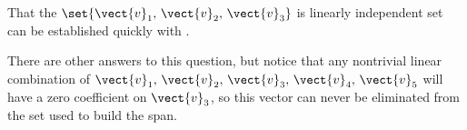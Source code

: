 %
That the $\set{\vect{v}_1,\,\vect{v}_2,\,\vect{v}_3}$ is linearly independent set can be established quickly with .\par
%
There are other answers to this question, but notice that any nontrivial linear combination of $\vect{v}_1,\,\vect{v}_2,\,\vect{v}_3,\,\vect{v}_4,\,\vect{v}_5$ will have a zero coefficient on $\vect{v}_3$, so this vector can never be eliminated from the set used to build the span.\par
